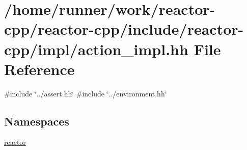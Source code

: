 \hypertarget{action__impl_8hh}{}\section{/home/runner/work/reactor-\/cpp/reactor-\/cpp/include/reactor-\/cpp/impl/action\+\_\+impl.hh File Reference}
\label{action__impl_8hh}
{\ttfamily \#include \char`\"{}../assert.\+hh\char`\"{}}\newline
{\ttfamily \#include \char`\"{}../environment.\+hh\char`\"{}}\newline
\subsection*{Namespaces}
\begin{DoxyCompactItemize}
\item 
 \hyperlink{namespacereactor}{reactor}
\end{DoxyCompactItemize}
